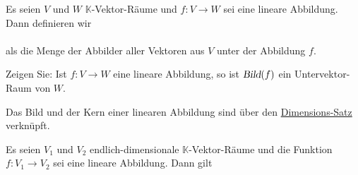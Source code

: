 \begin{Definition}[Bild]
Es seien $V$ und $W$ $\mathbb{K}$-Vektor-R\"{a}ume und $f:V \rightarrow W$ sei eine lineare Abbildung.  Dann 
definieren wir
\\[0.2cm]
\hspace*{1.3cm}
\colorbox{red}{}
\\[0.2cm]
als die Menge der Abbilder aller Vektoren aus $V$ unter der Abbildung $f$.
\eoxs
\end{Definition}

\exercise
Zeigen Sie: Ist $f: V \rightarrow W$ eine lineare Abbildung, so ist $\textsl{Bild}(f)$ ein Untervektor-Raum von $W$.
\eox

Das Bild und der Kern einer linearen Abbildung sind \"uber den
\href{https://de.wikipedia.org/wiki/Rangsatz}{Dimensions-Satz} verkn\"upft.

\begin{Satz}
  Es seien $V_1$ und $V_2$ endlich-dimensionale $\mathbb{K}$-Vektor-R\"{a}ume und die Funktion $f: V_1 \rightarrow V_2$ sei eine lineare Abbildung.
  Dann gilt
  \\[0.2cm]
  \hspace*{1.3cm}
  \colorbox{red}{}
\end{Satz}

